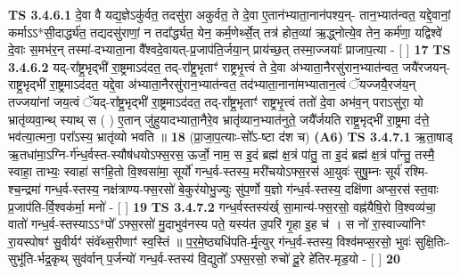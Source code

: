 \documentclass[17pt]{extarticle}
\begin{document}
                                        \textbf{ TS 3.4.6.1} \newline
                  दे॒वा वै यद्य॒ज्ञेऽकु॑र्वत॒ तदसु॑रा अकुर्वत॒ ते दे॒वा ए॒तान॑भ्याता॒नान॑पश्य॒न्- तान॒भ्यात॑न्वत॒ यद्दे॒वानां॒ कर्माऽऽ*सी॒दार्द्ध्य॑त॒ तद्यदसु॑राणां॒ न तदा᳚र्द्ध्यत॒ येन॒ कर्म॒णेर्थ्से॒त् तत्र॑ होत॒व्या॑ ऋ॒द्ध्नोत्ये॒व तेन॒ कर्म॑णा॒ यद्विश्वे॑ दे॒वाः स॒मभ॑र॒न् तस्मा॑-दभ्याता॒ना वै᳚श्वदे॒वायत्-प्र॒जाप॑ति॒र्जया॒न् प्राय॑च्छ॒त् तस्मा॒ज्जयाः᳚ प्राजाप॒त्या - [  ] \textbf{  17} \newline
                  \newline
                                \textbf{ TS 3.4.6.2} \newline
                  यद्-रा᳚ष्ट्र॒भृद्भी॑ रा॒ष्ट्रमाऽद॑दत॒ तद्-रा᳚ष्ट्र॒भृताꣳ॑ राष्ट्रभृ॒त्त्वं ते दे॒वा अ॑भ्याता॒नैरसु॑रान॒भ्यात॑न्वत॒ जयै॑रजयन्-राष्ट्र॒भृद्भी॑ रा॒ष्ट्रमाऽद॑दत॒ यद्दे॒वा अ॑भ्याता॒नैरसु॑रान॒भ्यात॑न्वत॒ तद॑भ्याता॒नाना॑मभ्यातान॒त्वं ॅयज्जयै॒रज॑य॒न् तज्जया॑नां जय॒त्वं ॅयद्-रा᳚ष्ट्र॒भृद्भी॑ रा॒ष्ट्रमाऽद॑दत॒ तद्-रा᳚ष्ट्र॒भृताꣳ॑ राष्ट्रभृ॒त्त्वं ततो॑ दे॒वा अभ॑व॒न् पराऽसु॑रा॒ यो भ्रातृ॑व्यवा॒न्थ् स्याथ् स ( ) ए॒तान् जु॑हुयादभ्याता॒नैरे॒व भ्रातृ॑व्यान॒भ्यात॑नुते॒ जयै᳚र्जयति राष्ट्र॒भृद्भी॑ रा॒ष्ट्रमा द॑त्ते॒ भव॑त्या॒त्मना॒ परा᳚ऽस्य॒ भ्रातृ॑व्यो भवति ॥ \textbf{  18 } \newline
                  \newline
                      (प्रा॒जा॒प॒त्याः-सो᳚ऽ-ष्टा द॑श च)  \textbf{(A6)} \newline \newline
                                        \textbf{ TS 3.4.7.1} \newline
                  ऋ॒ता॒षाड् ऋ॒तधा॑मा॒ऽग्नि-र्ग॑न्ध॒र्वस्त-स्यौष॑धयोऽफ्स॒रस॒ ऊर्जो॒ नाम॒ स इ॒दं ब्रह्म॑ क्ष॒त्रं पा॑तु॒ ता इ॒दं ब्रह्म॑ क्ष॒त्रं पा᳚न्तु॒ तस्मै॒ स्वाहा॒ ताभ्यः॒ स्वाहा॑ सꣳहि॒तो वि॒श्वसा॑मा॒ सूर्यो॑ गन्ध॒र्व-स्तस्य॒ मरी॑चयोऽफ्स॒रस॑ आ॒युवः॑ सुषु॒म्नः सूर्य॑ रश्मि-श्च॒न्द्रमा॑ गन्ध॒र्व-स्तस्य॒ नक्ष॑त्राण्य-फ्स॒रसो॑ बे॒कुर॑योभु॒ज्युः सु॑प॒र्णो य॒ज्ञो ग॑न्ध॒र्व-स्तस्य॒ दक्षि॑णा अप्स॒रस॑ स्त॒वाः प्र॒जाप॑ति-र्वि॒श्वक॑र्मा॒ मनो॑ - [  ] \textbf{  19} \newline
                  \newline
                                \textbf{ TS 3.4.7.2} \newline
                  गन्ध॒र्वस्तस्य॑र्ख् सा॒मान्य॑-फ्स॒रसो॒ वह्न॑यैषि॒रो वि॒श्वव्य॑चा॒ वातो॑ गन्ध॒र्व-स्तस्याऽऽ*पो᳚ ऽफ्स॒रसो॑ मु॒दाभुव॑नस्य पते॒ यस्य॑त उ॒परि॑ गृ॒हा इ॒ह च॑ । स नो॑ रा॒स्वाज्या॑निꣳ रा॒यस्पोषꣳ॑ सु॒वीर्यꣳ॑ संवॅथ्स॒रीणाꣳ॑ स्व॒स्तिं ॥ प॒र॒मे॒ष्ठ्यधि॑पति-र्मृ॒त्युर् ग॑न्ध॒र्व-स्तस्य॒ विश्व॑मप्स॒रसो॒ भुवः॑ सुक्षि॒तिः- सुभू॑ति-र्भद्र॒कृथ् सुव॑र्वान् प॒र्जन्यो॑ गन्ध॒र्व-स्तस्य॑ वि॒द्युतो᳚ ऽफ्स॒रसो॒ रुचो॑ दू॒रे हे॑तिर-मृड॒यो - [  ] \textbf{  20} \newline
\end{document}
